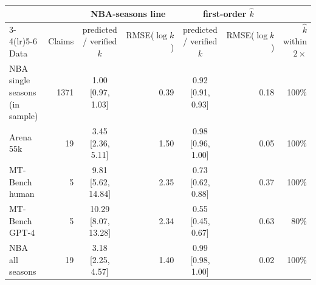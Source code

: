 \begin{tabular}{lrcrcrr}
\toprule
 & & \multicolumn{2}{c}{NBA-seasons line} & \multicolumn{2}{c}{first-order $\hat k$} & \\
\cmidrule(lr){3-4}\cmidrule(lr){5-6}
Data & Claims & predicted / verified $k$ & RMSE($\log k$) & predicted / verified $k$ & RMSE($\log k$) & $\hat k$ within $2\times$ \\
\midrule
NBA single seasons (in sample) & 1371 & 1.00 [0.97, 1.03] & 0.39 & 0.92 [0.91, 0.93] & 0.18 & 100\% \\
Arena 55k & 19 & 3.45 [2.36, 5.11] & 1.50 & 0.98 [0.96, 1.00] & 0.05 & 100\% \\
MT-Bench human & 5 & 9.81 [5.62, 14.84] & 2.35 & 0.73 [0.62, 0.88] & 0.37 & 100\% \\
MT-Bench GPT-4 & 5 & 10.29 [8.07, 13.28] & 2.34 & 0.55 [0.45, 0.67] & 0.63 & 80\% \\
NBA all seasons & 19 & 3.18 [2.25, 4.57] & 1.40 & 0.99 [0.98, 1.00] & 0.02 & 100\% \\
\bottomrule
\end{tabular}
